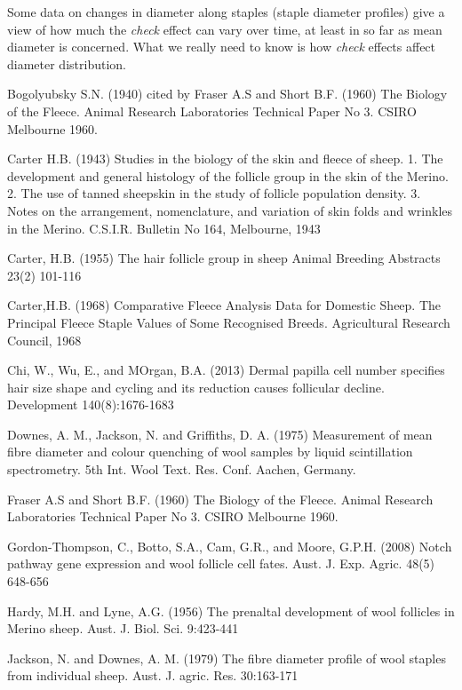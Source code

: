 \documentclass[titlepage]{article}  %
\begin{document}
Some data on changes in diameter along staples (staple diameter profiles) give a view of how much the {\em check} effect can vary over time, at least in so far as mean diameter is concerned. What we really need to know is how {\em check} effects affect diameter distribution.
\clearpage
\begin{thebibliography}{}

 Bogolyubsky S.N. (1940) cited by Fraser A.S and Short B.F. (1960) The Biology of the Fleece. Animal Research Laboratories Technical Paper No 3. CSIRO Melbourne 1960.


Carter H.B. (1943) Studies in the biology of the skin and fleece of sheep. 1. The development and general histology of the follicle group in the skin of the Merino. 2. The use of tanned sheepskin in the study of follicle population density. 3. Notes on the arrangement, nomenclature, and variation of skin folds and wrinkles in the Merino. C.S.I.R. Bulletin No 164, Melbourne, 1943

Carter, H.B. (1955) The hair follicle group in sheep Animal Breeding Abstracts 23(2) 101-116

Carter,H.B. (1968) Comparative Fleece Analysis Data for Domestic Sheep. The Principal Fleece Staple Values of Some Recognised Breeds. Agricultural Research Council, 1968

Chi, W., Wu, E., and MOrgan, B.A. (2013) Dermal papilla cell number specifies hair size shape and cycling and its reduction causes follicular decline. Development 140(8):1676-1683

Downes, A. M., Jackson, N. and Griffiths, D. A. (1975) Measurement of mean fibre diameter and colour quenching of wool samples by liquid scintillation spectrometry. 5th Int. Wool Text. Res. Conf. Aachen, Germany.

Fraser A.S and Short B.F. (1960) The Biology of the Fleece. Animal Research Laboratories Technical Paper No 3. CSIRO Melbourne 1960.

Gordon-Thompson, C., Botto, S.A., Cam, G.R., and Moore, G.P.H. (2008) Notch pathway gene expression and wool follicle cell fates. Aust. J. Exp. Agric. 48(5) 648-656

Hardy, M.H. and Lyne, A.G. (1956) The prenaltal development of wool follicles in Merino sheep. Aust. J. Biol. Sci. 9:423-441

Jackson, N. and Downes, A. M. (1979) The fibre diameter profile of wool staples from individual sheep. Aust. J. agric. Res. 30:163-171


\end{thebibliography}
\end{document}
